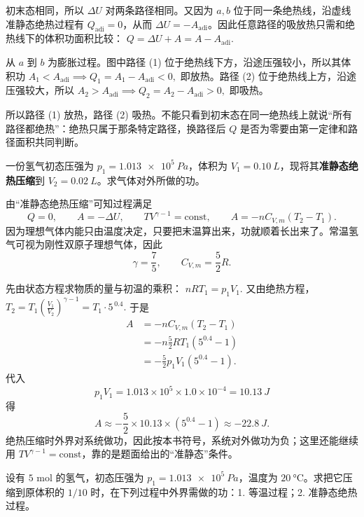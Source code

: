 \documentclass[lang=cn,11pt]{elegantbook}
\begin{document}
\begin{solution}
初末态相同，所以 \(\Delta U\) 对两条路径相同。又因为 \(a,b\) 位于同一条绝热线，沿虚线准静态绝热过程有 \(Q_{\text{adi}}=0\)，从而 \(\Delta U=-A_{\text{adi}}\)。因此任意路径的吸放热只需和绝热线下的体积功面积比较：
 \(Q=\Delta U+A=A-A_{\text{adi}}.\) 

从 \(a\) 到 \(b\) 为膨胀过程。图中路径 (1) 位于绝热线下方，沿途压强较小，所以其体积功
 \(A_1<A_{\text{adi}} \implies Q_1=A_1-A_{\text{adi}}<0,\) 
即放热。路径 (2) 位于绝热线上方，沿途压强较大，所以
 \(A_2>A_{\text{adi}} \implies Q_2=A_2-A_{\text{adi}}>0,\) 
即吸热。

所以路径 (1) 放热，路径 (2) 吸热。不能只看到初末态在同一绝热线上就说“所有路径都绝热”：绝热只属于那条特定路径，换路径后 \(Q\) 是否为零要由第一定律和路径面积共同判断。
\end{solution}

\begin{exercise}[氢气绝热压缩到 \(0.02\) L 时功怎样由 \(Q=0\) 算出]
一份氢气初态压强为 \(p_1=\SI{1.013e5}{Pa}\)，体积为 \(V_1=\SI{0.10}{L}\)，现将其\textbf{准静态绝热压缩}到 \(V_2=\SI{0.02}{L}\)。求气体对外所做的功。
\end{exercise}

\begin{solution}
由“准静态绝热压缩”可知过程满足
\[
Q=0,\qquad A=-\Delta U,\qquad
TV^{\gamma-1}=\text{const},\qquad
A=-nC_{V,m}(T_2-T_1).
\]
因为理想气体内能只由温度决定，只要把末温算出来，功就顺着长出来了。常温氢气可视为刚性双原子理想气体，因此
\[
\gamma=\frac75,\qquad C_{V,m}=\frac52 R.
\]

先由状态方程求物质的量与初温的乘积：
 \(nRT_1=p_1V_1.\) 
又由绝热方程，
 \(T_2=T_1\left(\frac{V_1}{V_2}\right)^{\gamma-1} =T_1\cdot 5^{\,0.4}.\) 
于是
\[
\begin{aligned}
A&=-nC_{V,m}(T_2-T_1)\\
&=-n\frac52 R T_1\left(5^{0.4}-1\right)\\
&=-\frac52 p_1V_1\left(5^{0.4}-1\right).
\end{aligned}
\]
代入
\[
p_1V_1=1.013\times10^5\times 1.0\times10^{-4}=\SI{10.13}{J}
\]
得
\[
A\approx -\frac52\times 10.13\times(5^{0.4}-1)\approx \SI{-22.8}{J}.
\]
绝热压缩时外界对系统做功，因此按本书符号，系统对外做功为负；这里还能继续用 \(TV^{\gamma-1}=\text{const}\)，靠的是题面给出的“准静态”条件。
\end{solution}

\begin{exercise}
设有 \(5\) mol 的氢气，初态压强为 \(p_1=\SI{1.013e5}{Pa}\)，温度为 \(\SI{20}{\celsius}\)。求把它压缩到原体积的 \(1/10\) 时，在下列过程中外界需做的功：1. 等温过程；2. 准静态绝热过程。
\end{exercise}
\end{document}
